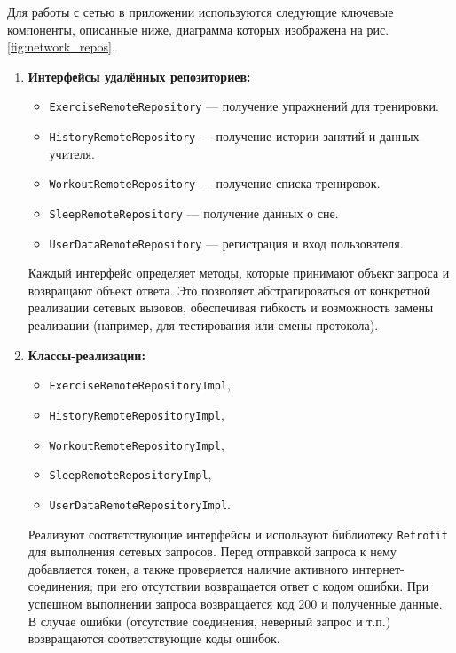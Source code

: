 Для работы с сетью в приложении используются следующие ключевые компоненты, описанные ниже, диаграмма которых изображена на рис. \ref{fig:network_repos}. 
\begin{enumerate}
    \item \textbf{Интерфейсы удалённых репозиториев:}
    \begin{itemize}
        \item \texttt{ExerciseRemoteRepository} — получение упражнений для тренировки.
        \item \texttt{HistoryRemoteRepository} — получение истории занятий и данных учителя.
        \item \texttt{WorkoutRemoteRepository} — получение списка тренировок.
        \item \texttt{SleepRemoteRepository} — получение данных о сне.
        \item \texttt{UserDataRemoteRepository} — регистрация и вход пользователя.
    \end{itemize}
    Каждый интерфейс определяет методы, которые принимают объект запроса и возвращают объект ответа. Это позволяет абстрагироваться от конкретной реализации сетевых вызовов, обеспечивая гибкость и возможность замены реализации (например, для тестирования или смены протокола).

    \item \textbf{Классы-реализации:}
    \begin{itemize}
        \item \texttt{ExerciseRemoteRepositoryImpl},
        \item \texttt{HistoryRemoteRepositoryImpl},
        \item \texttt{WorkoutRemoteRepositoryImpl},
        \item \texttt{SleepRemoteRepositoryImpl},
        \item \texttt{UserDataRemoteRepositoryImpl}.
    \end{itemize}
    Реализуют соответствующие интерфейсы и используют библиотеку \texttt{Retrofit} для выполнения сетевых запросов. Перед отправкой запроса к нему добавляется токен, а также проверяется наличие активного интернет-соединения; при его отсутствии возвращается ответ с кодом ошибки. При успешном выполнении запроса возвращается код 200 и полученные данные. В случае ошибки (отсутствие соединения, неверный запрос и т.п.) возвращаются соответствующие коды ошибок. \cite{refi}


\end{enumerate}
